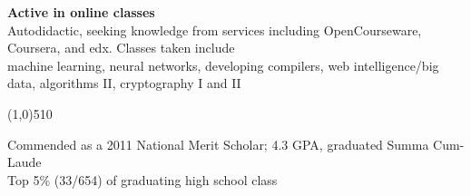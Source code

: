\documentclass{report}
\newcommand{\cut}{\begin{center} \line(1,0){510} \end{center}}
\begin{document}
\textbf{Active in online classes} \\
Autodidactic, seeking knowledge from services including
OpenCourseware, Coursera, and edx. Classes taken include \\
machine learning, neural networks, developing compilers, web
intelligence/big data, algorithms II, cryptography I and II

\cut{}

Commended as a 2011 National Merit Scholar; 4.3 GPA, graduated Summa Cum-Laude \\
Top 5\% (33/654) of graduating high school class
\end{document}
